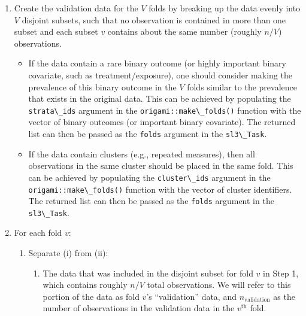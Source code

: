 \documentclass[12pt, krantz2,]{krantz}
\newcommand{\passthrough}[1]{#1}
\providecommand{\tightlist}{%
  \setlength{\itemsep}{0pt}\setlength{\parskip}{0pt}}
\theoremstyle{definition}
\theoremstyle{definition}
\theoremstyle{definition}
\newcommand{\1}{\mathbbm{1}}
\begin{document}
\begin{enumerate}
\def\labelenumi{\arabic{enumi}.}
\item
  Create the validation data for the \(V\) folds by breaking up the data evenly
  into \(V\) disjoint subsets, such that no observation is contained in more
  than one subset and each subset \(v\) contains about the same number (roughly
  \(n/V\)) observations.

  \begin{itemize}
  \tightlist
  \item
    If the data contain a rare binary outcome (or highly important binary
    covariate, such as treatment/exposure), one should consider making the
    prevalence of this binary outcome in the \(V\) folds similar to the
    prevalence that exists in the original data. This can be achieved
    by populating the \passthrough{\lstinline!strata\_ids!} argument in the \passthrough{\lstinline!origami::make\_folds()!}
    function with the vector of binary outcomes (or important binary
    covariate). The returned list can then be passed as the \passthrough{\lstinline!folds!} argument
    in the \passthrough{\lstinline!sl3\_Task!}.
  \item
    If the data contain clusters (e.g., repeated measures), then all
    observations in the same cluster should be placed in the same fold.
    This can be achieved by populating the \passthrough{\lstinline!cluster\_ids!} argument in the
    \passthrough{\lstinline!origami::make\_folds()!} function with the vector of cluster identifiers.
    The returned list can then be passed as the \passthrough{\lstinline!folds!} argument in the
    \passthrough{\lstinline!sl3\_Task!}.
  \end{itemize}
\item
  For each fold \(v\):

  \begin{enumerate}
  \def\labelenumii{\alph{enumii}.}
  \item
    Separate (i) from (ii):

    \begin{enumerate}
    \def\labelenumiii{\roman{enumiii}.}
    \tightlist
    \item
      The data that was included in the disjoint subset for fold \(v\) in Step
      1, which contains roughly \(n/V\) total observations. We will refer to
      this portion of the data as fold \(v\)'s ``validation'' data, and
      \(n_{\text{validation}}\) as the number of observations in the
      validation data in the \(v^{\text{th}}\) fold.
    \end{enumerate}
  \end{enumerate}


\end{enumerate}
\end{document}
